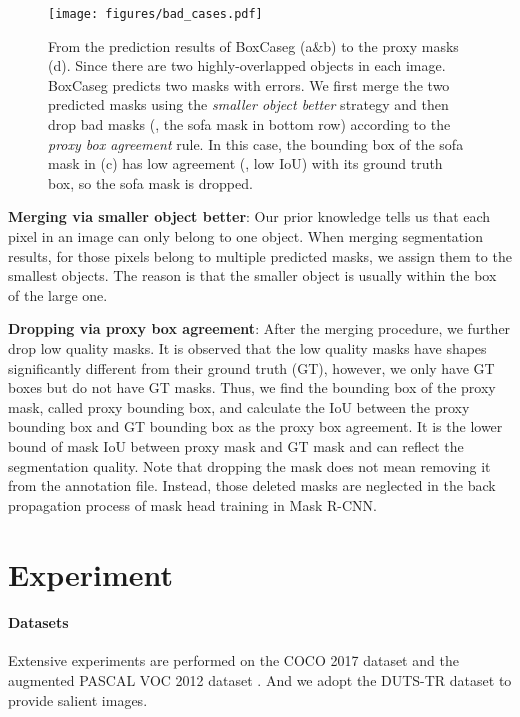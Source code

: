 \documentclass[final]{cvpr}
\begin{document}
\begin{figure*}[htp]
\centering
\texttt{[image: figures/bad\_cases.pdf]}
\caption{From the prediction results of BoxCaseg (a\&b) to the proxy masks (d). Since there are two highly-overlapped objects in each image. BoxCaseg predicts two masks with errors. We first merge the two predicted masks using the \textit{smaller object better} strategy and then drop bad masks (\eg, the sofa mask in bottom row) according to the \textit{proxy box agreement} rule. In this case, the bounding box of the sofa mask in (c) has low agreement (\ie, low IoU) with its ground truth box, so the sofa mask is dropped.}
\label{fig:badcases}
\end{figure*}

\textbf{Merging via smaller object better}:
Our prior knowledge tells us that each pixel in an image can only belong to one object. When merging segmentation results, for those pixels belong to multiple predicted masks, we assign them to the smallest objects. The reason is that the smaller object is usually within the box of the large one. 






\textbf{Dropping via proxy box agreement}: After the merging procedure, we further drop low quality masks. It is observed that the low quality masks have shapes significantly different from their ground truth (GT), however, we only have GT boxes but do not have GT masks. Thus, we find the bounding box of the proxy mask, called proxy bounding box, and calculate the IoU between the proxy bounding box and GT bounding box as the proxy box agreement. It is the lower bound of mask IoU between proxy mask and GT mask and can reflect the segmentation quality. Note that dropping the mask does not mean removing it from the annotation file. Instead, those deleted masks are neglected in the back propagation process of mask head training in Mask R-CNN.

\vspace{-1mm}
\section{Experiment}

\paragraph{Datasets}

Extensive experiments are performed on the COCO 2017 dataset \cite{lin2014microsoft} and the augmented PASCAL VOC 2012 dataset \cite{hariharan2011semantic}. And we adopt the DUTS-TR dataset \cite{wang2017learning} to provide salient images.
\end{document}

